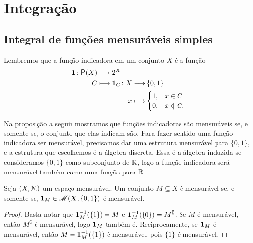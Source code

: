 
\section{Integração}

\subsection{Integral de funções mensuráveis simples}

Lembremos que a função indicadora em um conjunto $X$ é a função
	\begin{align*}
	\func{\idc}{\p(X)}{2^X}{C}{
		\begin{aligned}[t]
		\func{\idc_C}{X}{\{0,1\}}{x}{
			\begin{cases}
			1,& x \in C \\
			0,& x \notin C.
			\end{cases}
		}
		\end{aligned}
	}
	\end{align*}

Na proposição a seguir mostramos que funções indicadoras são mensuráveis se, e somente se, o conjunto que elas indicam são. Para fazer sentido uma função indicadora ser mensurável, precisamos dar uma estrutura mensurável para $\{0,1\}$, e a estrutura que escolhemos é a álgebra discreta. Essa é a álgebra induzida se consideramos $\{0,1\}$ como subconjunto de $\mathbb{R}$, logo a função indicadora será mensurável também como uma função para $\mathbb{R}$.

\begin{proposition}
Seja $(X,\mathcal{M})$ um espaço mensurável. Um conjunto $M \subseteq X$ é mensurável se, e somente se, ${\bm 1}_M \in \mathscr{M}(\bm X,\{0,1\})$ é mensurável.
\end{proposition}
\begin{proof}
Basta notar que ${\bm 1}_M^{-1}(\{1\}) = M$ e ${\bm 1}_M^{-1}(\{0\}) = M^\complement$. Se $M$ é mensurável, então $M^\complement$ é mensurável, logo ${\bm 1}_M$ também é. Reciprocamente, se ${\bm 1}_M$ é mensurável, então $M = {\bm 1}_M^{-1}(\{1\})$ é mensurável, pois $\{1\}$ é mensurável.
\end{proof}


